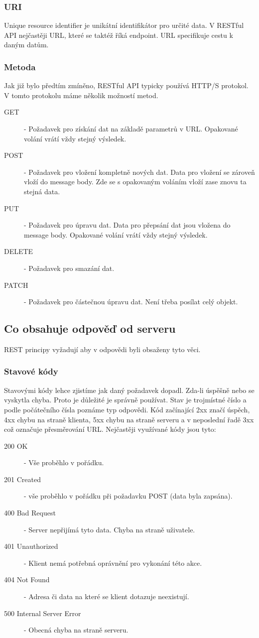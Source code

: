 \subsubsection{URI}
Unique resource identifier je unikátní identifikátor pro určité data. V RESTful API nejčastěji URL, které se taktéž říká endpoint. URL specifikuje cestu k daným datům.
\subsubsection{Metoda}
Jak již bylo předtím zmíněno, RESTful API typicky používá HTTP/S protokol. V tomto protokolu máme několik možností metod.

\begin{description}
    \item[GET] - Požadavek pro získání dat na základě parametrů v URL. Opakované volání vrátí vždy stejný výsledek.
    \item[POST] - Požadavek pro vložení kompletně nových dat. Data pro vložení se zároveň vloží do message body. Zde se s opakovaným voláním vloží zase znovu ta stejná data.
    \item[PUT] - Požadavek pro úpravu dat. Data pro přepsání dat jsou vložena do message body. Opakované volání vrátí vždy stejný výsledek.
    \item[DELETE] - Požadavek pro smazání dat.
    \item[PATCH] - Požadavek pro částečnou úpravu dat. Není třeba posílat celý objekt.
\end{description}

\subsection{Co obsahuje odpověď od serveru}
REST principy vyžadují aby v odpovědi byli obsaženy tyto věci.
\subsubsection{Stavové kódy}
Stavovými kódy lehce zjistíme jak daný požadavek dopadl. Zda-li úspěšně nebo se vyskytla chyba. Proto je důležité je správně používat. Stav je trojmístné číslo a podle počátečního čísla poznáme typ odpovědi. Kód začínající 2xx značí úspěch, 4xx chybu na straně klienta, 5xx chybu na straně serveru a v neposlední řadě 3xx což označuje přesměrování URL.
Nejčastěji využívané kódy jsou tyto:

\begin{description}
    \item[200 OK] - Vše proběhlo v pořádku.
    \item[201 Created] - vše proběhlo v pořádku při požadavku POST (data byla zapsána).
    \item[400 Bad Request] - Server nepřijímá tyto data. Chyba na straně uživatele.
    \item[401 Unauthorized] - Klient nemá potřebná oprávnění pro vykonání této akce.
    \item[404 Not Found] - Adresa či data na které se klient dotazuje neexistují.
    \item[500 Internal Server Error] - Obecná chyba na straně serveru.
\end{description}


